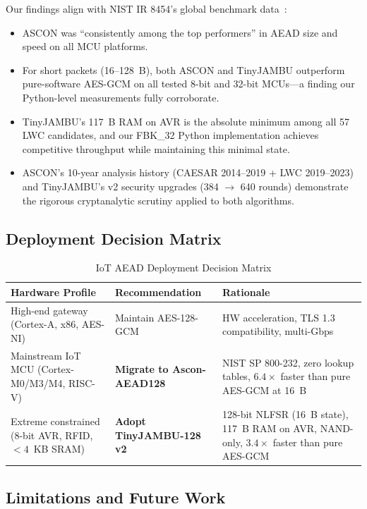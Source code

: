 \documentclass[11pt,a4paper]{article}
\begin{document}
Our findings align with NIST IR 8454's global benchmark data~\cite{nistir8454}:
\begin{itemize}
    \item ASCON was ``consistently among the top performers'' in AEAD size and speed on all MCU platforms.
    \item For short packets (16--128~B), both ASCON and TinyJAMBU outperform pure-software AES-GCM on all tested 8-bit and 32-bit MCUs---a finding our Python-level measurements fully corroborate.
    \item TinyJAMBU's 117~B RAM on AVR is the absolute minimum among all 57 LWC candidates, and our FBK\_32 Python implementation achieves competitive throughput while maintaining this minimal state.
    \item ASCON's 10-year analysis history (CAESAR 2014--2019 + LWC 2019--2023) and TinyJAMBU's v2 security upgrades (384 $\to$ 640 rounds) demonstrate the rigorous cryptanalytic scrutiny applied to both algorithms.
\end{itemize}

\subsection{Deployment Decision Matrix}

\begin{table}[H]
\centering
\caption{IoT AEAD Deployment Decision Matrix}
\label{tab:decision}
\small
\begin{tabular}{p{5cm}p{4cm}p{5.5cm}}
\toprule
\textbf{Hardware Profile} & \textbf{Recommendation} & \textbf{Rationale}  \\
\midrule
High-end gateway (Cortex-A, x86, AES-NI) & Maintain AES-128-GCM & HW acceleration, TLS 1.3 compatibility, multi-Gbps  \\
\midrule
Mainstream IoT MCU (Cortex-M0/M3/M4, RISC-V) & \textbf{Migrate to Ascon-AEAD128} & NIST SP 800-232, zero lookup tables, $6.4\times$ faster than pure AES-GCM at 16~B  \\
\midrule
Extreme constrained (8-bit AVR, RFID, $<4$~KB SRAM) & \textbf{Adopt TinyJAMBU-128 v2} & 128-bit NLFSR (16~B state), 117~B RAM on AVR, NAND-only, $3.4\times$ faster than pure AES-GCM \\
\bottomrule
\end{tabular}
\end{table}

\subsection{Limitations and Future Work}
\end{document}
